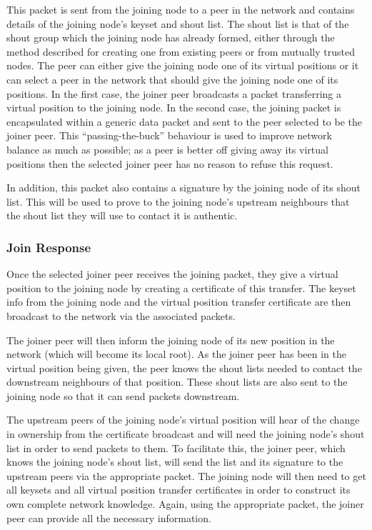 \documentclass[ %
                    author={Luke Murray},
                supervisor={Dr. Simon Hollis},
                     title={Shadow Peer-to-Peer Networks},
                  subtitle={},
                    degree={MEng},
                      year={2013} ]{thesis}
\begin{document}
This packet is sent from the joining node to a peer in the network and contains details of the joining node's keyset and shout list. The shout list is that of the shout group which the joining node has already formed, either through the method described for creating one from existing peers or from mutually trusted nodes. The peer can either give the joining node one of its virtual positions or it can select a peer in the network that should give the joining node one of its positions. In the first case, the joiner peer broadcasts a packet transferring a virtual position to the joining node. In the second case, the joining packet is encapsulated within a generic data packet and sent to the peer selected to be the joiner peer. This ``passing-the-buck'' behaviour is used to improve network balance as much as possible; as a peer is better off giving away its virtual positions then the selected joiner peer has no reason to refuse this request.

In addition, this packet also contains a signature by the joining node of its shout list. This will be used to prove to the joining node's upstream neighbours that the shout list they will use to contact it is authentic.

\subsubsection{Join Response}

Once the selected joiner peer receives the joining packet, they give a virtual position to the joining node by creating a certificate of this transfer. The keyset info from the joining node and the virtual position transfer certificate are then broadcast to the network via the associated packets.

The joiner peer will then inform the joining node of its new position in the network (which will become its local root). As the joiner peer has been in the virtual position being given, the peer knows the shout lists needed to contact the downstream neighbours of that position. These shout lists are also sent to the joining node so that it can send packets downstream.

The upstream peers of the joining node's virtual position will hear of the change in ownership from the certificate broadcast and will need the joining node's shout list in order to send packets to them. To facilitate this, the joiner peer, which knows the joining node's shout list, will send the list and its signature to the upstream peers via the appropriate packet. The joining node will then need to get all keysets and all virtual position transfer certificates in order to construct its own complete network knowledge. Again, using the appropriate packet, the joiner peer can provide all the necessary information.
\end{document}
